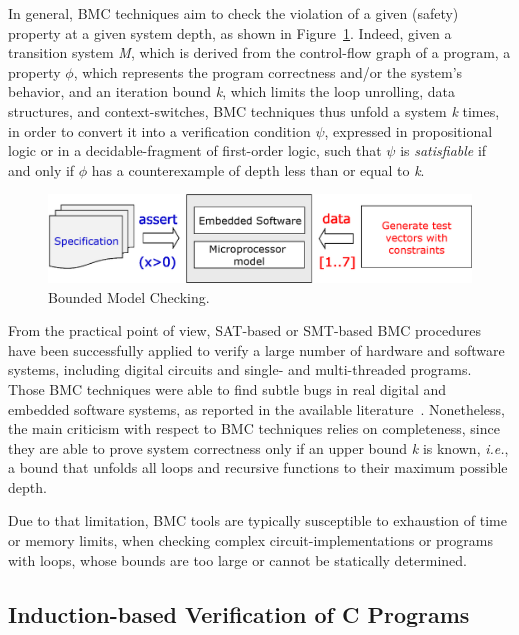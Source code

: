 \documentclass{acm_sen_article}
\begin{document}
In general, BMC techniques aim to check the violation of a given (safety) property at a given system depth, as shown in Figure~\ref{bounded-model-checking}. Indeed, given a transition system \textit{M}, which is derived from the control-flow graph of a program, a property $\phi$, which represents the program correctness and/or the system's behavior, and an iteration bound \textit{k}, which limits the loop unrolling, data structures, and context-switches, BMC techniques thus unfold a system \textit{k} times, in order to convert it into a verification condition $\psi$, expressed in propositional logic or in a decidable-fragment of first-order logic, such that $\psi$ is \textit{satisfiable} if and only if $\phi$ has a counterexample of depth less than or equal to \textit{k}.

\begin{figure}[h]
	\centering
	\includegraphics[scale=0.35]{figure2.eps}
	\caption{Bounded Model Checking.}
	\label{bounded-model-checking}
\end{figure}


From the practical point of view, SAT-based or SMT-based BMC procedures have been successfully applied to verify a large number of hardware and software systems, including digital circuits and single- and multi-threaded programs. Those BMC techniques were able to find subtle bugs in real digital and embedded software systems, as reported in the available literature~\cite{Clarke04,MerzFS12,CordeiroF11,Ivancic05,Cordeiro12}. Nonetheless, the main criticism with respect to BMC techniques relies on completeness, since they are able to prove system correctness only if an upper bound \textit{k} is known, {\it i.e.}, a bound that unfolds all loops and recursive functions to their maximum possible depth. 

Due to that limitation, BMC tools are typically susceptible to exhaustion of time or memory limits, when checking complex circuit-implementations or programs with loops, whose bounds are too large or cannot be statically determined.  

\subsection{Induction-based Verification of C Programs}
\end{document}
